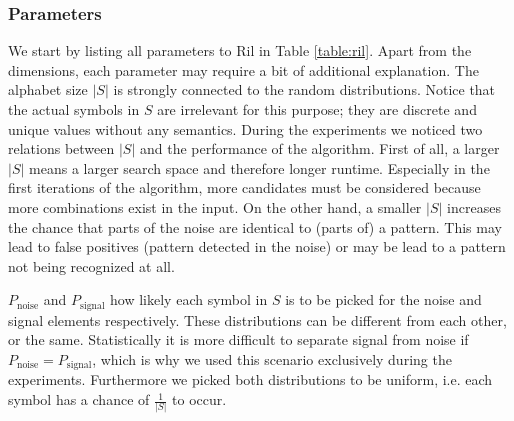 \documentclass{llncs}
\begin{document}
\subsubsection{Parameters}

We start by listing all parameters to Ril in Table \ref{table:ril}. Apart from the dimensions, each parameter may require a bit of additional explanation. The alphabet size $|S|$ is strongly connected to the random distributions. Notice that the actual symbols in $S$ are irrelevant for this purpose; they are discrete and unique values without any semantics. During the experiments we noticed two relations between $|S|$ and the performance of the algorithm. First of all, a larger $|S|$ means a larger search space and therefore longer runtime. Especially in the first iterations of the algorithm, more candidates must be considered because more combinations exist in the input. On the other hand, a smaller $|S|$ increases the chance that parts of the noise are identical to (parts of) a pattern. This may lead to false positives (pattern detected in the noise) or may be lead to a pattern not being recognized at all. 
  
$P_{\mathrm{noise}}$ and $P_{\mathrm{signal}}$ how likely each symbol in $S$ is to be picked for the noise and signal elements respectively. These distributions can be different from each other, or the same. Statistically it is more difficult to separate signal from noise if $P_{\mathrm{noise}} = P_{\mathrm{signal}}$, which is why we used this scenario exclusively during the experiments. Furthermore we picked both distributions to be uniform, i.e. each symbol has a chance of $\frac{1}{|S|}$ to occur.
\end{document}
